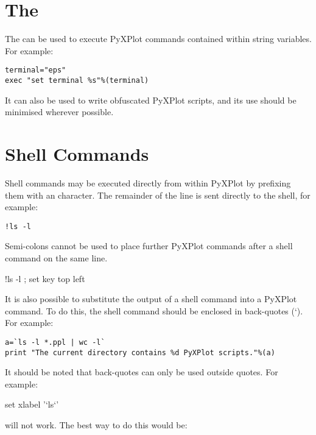 \section{The }

The  can be used to execute PyXPlot commands contained within
string variables. For example:

\begin{verbatim}
terminal="eps"
exec "set terminal %s"%(terminal)
\end{verbatim}

\noindent It can also be used to write obfuscated PyXPlot scripts, and its use
should be minimised wherever possible.

\section{Shell Commands}

Shell commands may be executed directly from
within PyXPlot by prefixing them with an \indcmdts{!} character. The
remainder of the line is sent directly to the shell, for example:

\begin{verbatim}
!ls -l
\end{verbatim}

\noindent Semi-colons cannot be used to place further PyXPlot commands after a
shell command on the same line.

\begin{dontdo}
!ls -l ; set key top left
\end{dontdo}

It is also possible to substitute the output of a shell command into a PyXPlot
command. To do this, the shell command should be enclosed in back-quotes (`).
For example:

\begin{verbatim}
a=`ls -l *.ppl | wc -l`
print "The current directory contains %d PyXPlot scripts."%(a)
\end{verbatim}

It should be noted that back-quotes can only be used outside quotes. For
example:

\begin{dontdo}
set xlabel '`ls`'
\end{dontdo}

\noindent will not work. The best way to do this would be:

